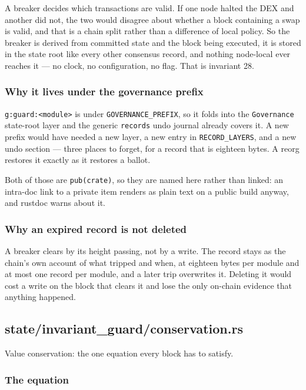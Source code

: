 \documentclass[11pt,a4paper]{article}
\begin{document}
A breaker decides which transactions are valid. If one node halted the DEX
and another did not, the two would disagree about whether a block
containing a swap is valid, and that is a chain split rather than a
difference of local policy. So the breaker is derived from committed state
and the block being executed, it is stored in the state root like every
other consensus record, and nothing node-local ever reaches it — no clock,
no configuration, no flag. That is invariant 28.

\subsubsection{Why it lives under the governance prefix}

\texttt{g:guard:<module>} is under \texttt{GOVERNANCE\_PREFIX}, so it folds into the
\texttt{Governance} state-root layer and the generic \texttt{records} undo journal already
covers it. A new prefix would have needed a new layer, a new entry in
\texttt{RECORD\_LAYERS}, and a new undo section — three places to forget, for a
record that is eighteen bytes. A reorg restores it exactly as it restores a
ballot.

Both of those are \texttt{pub(crate)}, so they are named here rather than linked:
an intra-doc link to a private item renders as plain text on a public build
anyway, and rustdoc warns about it.

\subsubsection{Why an expired record is not deleted}

A breaker clears by its height passing, not by a write. The record stays as
the chain's own account of what tripped and when, at eighteen bytes per
module and at most one record per module, and a later trip overwrites it.
Deleting it would cost a write on the block that clears it and lose the only
on-chain evidence that anything happened.

\subsection{state/invariant\_guard/conservation.rs}
Value conservation: the one equation every block has to satisfy.

\subsubsection{The equation}
\end{document}
